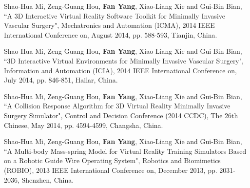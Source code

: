 \begin{publications}{99}
\item Shao-Hua Mi, Zeng-Guang Hou, \textbf{Fan Yang}, Xiao-Liang Xie and Gui-Bin Bian, ``A 3D Interactive Virtual Reality Software Toolkit for Minimally Invasive Vascular Surgery", Mechatronics and Automation (ICMA), 2014 IEEE International Conference on, August 2014, pp. 588-593, Tianjin, China.%

\item Shao-Hua Mi, Zeng-Guang Hou, \textbf{Fan Yang}, Xiao-Liang Xie and Gui-Bin Bian, ``3D Interactive Virtual Environments for Minimally Invasive Vascular Surgery", Information and Automation (ICIA), 2014 IEEE International Conference on, July 2014, pp. 846-851, Hailar, China.%

\item Shao-Hua Mi, Zeng-Guang Hou, \textbf{Fan Yang}, Xiao-Liang Xie and Gui-Bin Bian, ``A Collision Response Algorithm for 3D Virtual Reality Minimally Invasive Surgery Simulator", Control and Decision Conference (2014 CCDC), The 26th Chinese, May 2014, pp. 4594-4599, Changsha, China.%

\item Shao-Hua Mi, Zeng-Guang Hou, \textbf{Fan Yang}, Xiao-Liang Xie and Gui-Bin Bian, ``A Multi-body Mass-spring Model for Virtual Reality Training Simulators Based on a Robotic Guide Wire Operating System", Robotics and Biomimetics (ROBIO), 2013 IEEE International Conference on, December 2013, pp. 2031-2036, Shenzhen, China.%

\end{publications}
